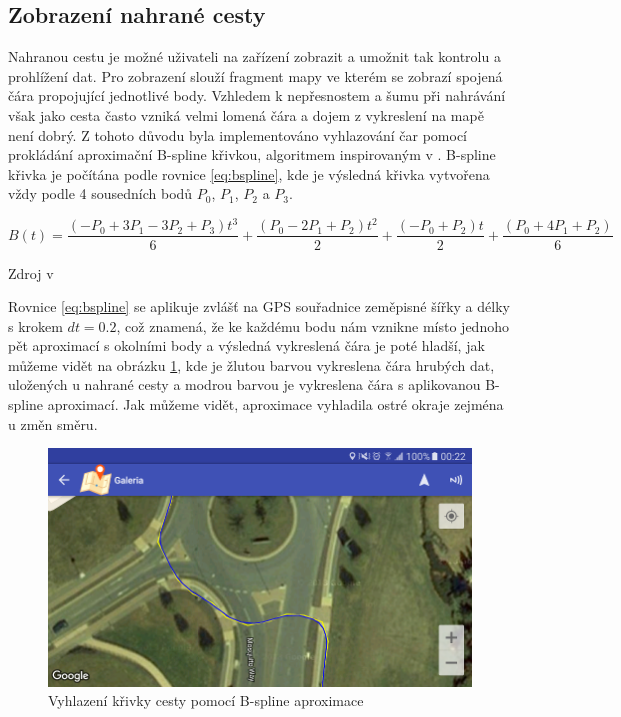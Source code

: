 \documentclass[czech,master,public,dept460,male,java,cpdeclaration]{diploma}
\begin{document}
\subsection{Zobrazení nahrané cesty}
Nahranou cestu je možné uživateli na zařízení zobrazit a umožnit tak kontrolu a prohlížení dat.
Pro zobrazení slouží fragment mapy ve kterém se zobrazí spojená čára propojující jednotlivé body.
Vzhledem k nepřesnostem a šumu při nahrávání však jako cesta často vzniká velmi lomená čára a dojem z vykreslení
na mapě není dobrý. Z tohoto důvodu byla implementováno vyhlazování čar pomocí prokládání aproximační
B-spline křivkou, algoritmem inspirovaným v \cite{bspline}. B-spline křivka je počítána podle
rovnice \ref{eq:bspline}, kde je výsledná křivka vytvořena vždy podle 4 sousedních bodů $P_0$, $P_1$,
$P_2$ a $P_3$.

\begin{equation}
B(t)=\frac{(-P_0 + 3P_1 - 3P_2 + P_3)t^3}{6} + \frac{(P_0 - 2P_1 + P_2)t^2}{2} + \frac{(-P_0 + P_2)t}{2} + \frac{(P_0 + 4P_1 + P_2)}{6}
\label{eq:bspline}
\end{equation}
\centerline{Zdroj v \cite{bspline}}
\vspace{0.2cm}


Rovnice \ref{eq:bspline} se aplikuje zvlášť na GPS souřadnice zeměpisné šířky a délky s krokem $dt = 0.2$,
 což znamená, že ke každému bodu nám vznikne místo jednoho pět aproximací s okolními body a výsledná
 vykreslená čára je poté hladší, jak můžeme vidět na obrázku \ref{fig:splinediff}, kde je žlutou barvou
 vykreslena čára hrubých dat, uložených u nahrané cesty a modrou barvou je vykreslena čára s aplikovanou
 B-spline aproximací. Jak můžeme vidět, aproximace vyhladila ostré okraje zejména u změn směru.

\begin{figure}[H]
        \centering
                \includegraphics[scale=0.3]{img/screen/bsplineapplied.png}
        \caption{Vyhlazení křivky cesty pomocí B-spline aproximace}
        \label{fig:splinediff}
\end{figure}
\end{document}
